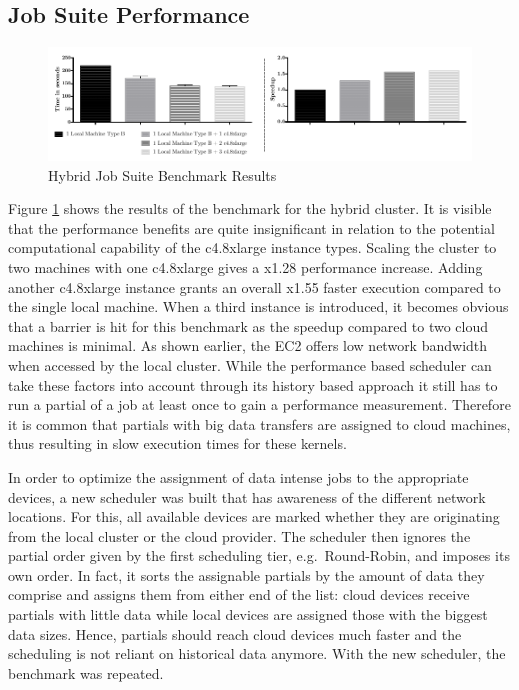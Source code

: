 \subsection*{Job Suite Performance}

\begin{figure}[H]
	\includegraphics[width=1.0\textwidth]{images/hybrid_full_benchmark_performance_based.pdf}
	\centering
	\caption{Hybrid Job Suite Benchmark Results}
	\label{img:hybrid_benchmark_results}
\end{figure}

Figure \ref{img:hybrid_benchmark_results} shows the results of the benchmark for the hybrid cluster. It is visible that the performance benefits are quite insignificant in relation to the potential computational capability of the c4.8xlarge instance types. Scaling the cluster to two machines with one c4.8xlarge gives a x1.28 performance increase. Adding another c4.8xlarge instance grants an overall x1.55 faster execution compared to the single local machine. When a third instance is introduced, it becomes obvious that a barrier is hit for this benchmark as the speedup compared to two cloud machines is minimal. As shown earlier, the EC2 offers low network bandwidth when accessed by the local cluster. While the performance based scheduler can take these factors into account through its history based approach it still has to run a partial of a job at least once to gain a performance measurement. Therefore it is common that partials with big data transfers are assigned to cloud machines, thus resulting in slow execution times for these kernels.

In order to optimize the assignment of data intense jobs to the appropriate devices, a new scheduler was built that has awareness of the different network locations. For this, all available devices are marked whether they are originating from the local cluster or the cloud provider. The scheduler then ignores the partial order given by the first scheduling tier, e.g.~Round-Robin, and imposes its own order. In fact, it sorts the assignable partials by the amount of data they comprise and assigns them from either end of the list: cloud devices receive partials with little data while local devices are assigned those with the biggest data sizes. Hence, partials should reach cloud devices much faster and the scheduling is not reliant on historical data anymore. With the new scheduler, the benchmark was repeated.

